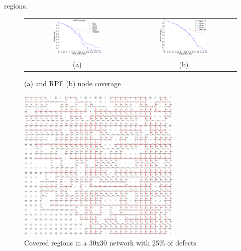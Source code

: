regions. 
\begin{figure}
\centering
\begin{tabular}{cc}
\includegraphics[width=0.48\textwidth]{pictures/set1.eps} & 
\includegraphics[width=0.48\textwidth]{pictures/coverage.eps} \\
(a) & (b) 
\end{tabular}
\caption{\disr{} (a) and RPF (b) node coverage}
\label{fig:results_coverage}
\end{figure}

\begin{figure}
\centering
\includegraphics[width=0.70\textwidth]{pictures/net.ps}
\caption{Covered regions in a 30x30 network with 25\% of defects}
\label{fig:net}
\end{figure}

